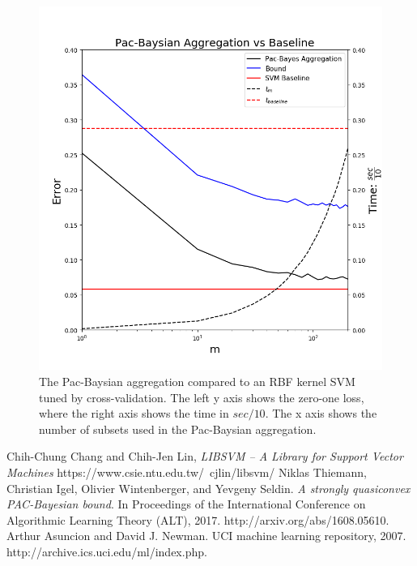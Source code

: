 \documentclass{article}
\begin{document}
\begin{figure}[H]
 \centering
  \includegraphics[width=17cm]{fig/2.png}
  \caption{\footnotesize The Pac-Baysian aggregation compared to an RBF kernel SVM tuned by cross-validation. The left y axis shows the zero-one loss, where the right axis shows the time in $sec/10$. The x axis shows the number of subsets used in the Pac-Baysian aggregation.}
\label{fig:1} 
\end{figure}

\newpage
\begin{thebibliography}{9}
Chih-Chung Chang and Chih-Jen Lin,  \textit{LIBSVM -- A Library for Support Vector Machines} https://www.csie.ntu.edu.tw/~cjlin/libsvm/
Niklas Thiemann, Christian Igel, Olivier Wintenberger, and Yevgeny Seldin. \textit{A strongly quasiconvex
PAC-Bayesian bound}. In Proceedings of the International Conference on Algorithmic Learning Theory
(ALT), 2017. http://arxiv.org/abs/1608.05610.
Arthur Asuncion and David J. Newman. UCI machine learning repository, 2007. http://archive.ics.uci.edu/ml/index.php.
\end{thebibliography}
\end{document}
